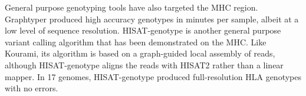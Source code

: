 General purpose genotyping tools have also targeted the MHC region.
Graphtyper \cite{eggertsson2017graphtyper} produced high accuracy genotypes in minutes per sample, albeit at a low level of sequence resolution.
HISAT-genotype \cite{Kim_2019} is another general purpose variant calling algorithm that has been demonstrated on the MHC.
Like Kourami, its algorithm is based on a graph-guided local assembly of reads, although HISAT-genotype aligns the reads with HISAT2 rather than a linear mapper.
In 17 genomes, HISAT-genotype produced full-resolution HLA genotypes with no errors.





